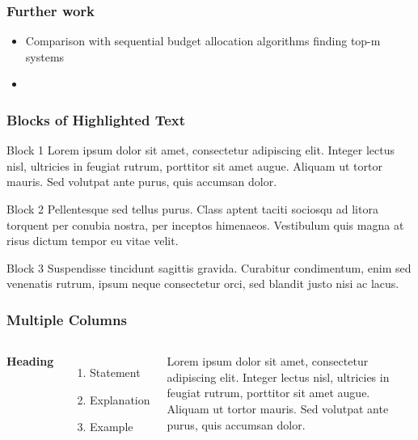 \documentclass[aspectratio=169]{beamer}
\begin{document}

\begin{frame}
\frametitle{Further work}

\begin{itemize}
    \item Comparison with sequential budget allocation algorithms finding top-m systems
    \item 
\end{itemize}
    
 


\end{frame}






\begin{frame}
\frametitle{Blocks of Highlighted Text}
\begin{block}{Block 1}
Lorem ipsum dolor sit amet, consectetur adipiscing elit. Integer lectus nisl, ultricies in feugiat rutrum, porttitor sit amet augue. Aliquam ut tortor mauris. Sed volutpat ante purus, quis accumsan dolor.
\end{block}

\begin{block}{Block 2}
Pellentesque sed tellus purus. Class aptent taciti sociosqu ad litora torquent per conubia nostra, per inceptos himenaeos. Vestibulum quis magna at risus dictum tempor eu vitae velit.
\end{block}

\begin{block}{Block 3}
Suspendisse tincidunt sagittis gravida. Curabitur condimentum, enim sed venenatis rutrum, ipsum neque consectetur orci, sed blandit justo nisi ac lacus.
\end{block}
\end{frame}


\begin{frame}
\frametitle{Multiple Columns}
\begin{columns}[c] %

\textbf{Heading}
\begin{enumerate}
\item Statement
\item Explanation
\item Example
\end{enumerate}

Lorem ipsum dolor sit amet, consectetur adipiscing elit. Integer lectus nisl, ultricies in feugiat rutrum, porttitor sit amet augue. Aliquam ut tortor mauris. Sed volutpat ante purus, quis accumsan dolor.

\end{columns}
\end{frame}
\end{document}
